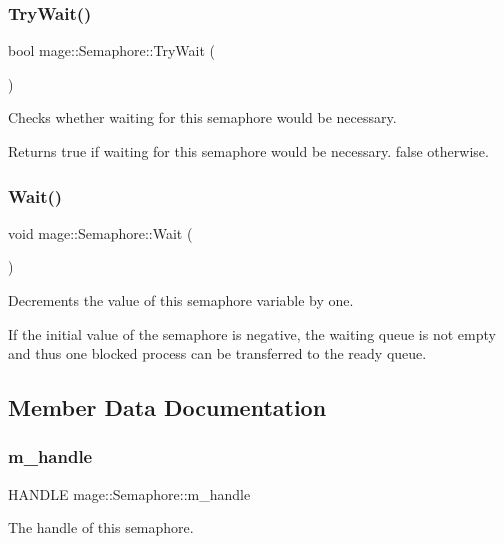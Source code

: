 \subsubsection{\texorpdfstring{Try\+Wait()}{TryWait()}}
{\footnotesize\ttfamily bool mage\+::\+Semaphore\+::\+Try\+Wait (\begin{DoxyParamCaption}{ }\end{DoxyParamCaption})}

Checks whether waiting for this semaphore would be necessary.

\begin{DoxyReturn}{Returns}
{\ttfamily true} if waiting for this semaphore would be necessary. {\ttfamily false} otherwise. 
\end{DoxyReturn}
\hypertarget{classmage_1_1_semaphore_ae63599939b6bcc3939cbeddd7ffa5f66}{}\label{classmage_1_1_semaphore_ae63599939b6bcc3939cbeddd7ffa5f66} 
\subsubsection{\texorpdfstring{Wait()}{Wait()}}
{\footnotesize\ttfamily void mage\+::\+Semaphore\+::\+Wait (\begin{DoxyParamCaption}{ }\end{DoxyParamCaption})}

Decrements the value of this semaphore variable by one.

If the initial value of the semaphore is negative, the waiting queue is not empty and thus one blocked process can be transferred to the ready queue. 

\subsection{Member Data Documentation}
\hypertarget{classmage_1_1_semaphore_ac1ded856984b4ac3739d9ff627838fda}{}\label{classmage_1_1_semaphore_ac1ded856984b4ac3739d9ff627838fda} 
\subsubsection{\texorpdfstring{m\+\_\+handle}{m\_handle}}
{\footnotesize\ttfamily H\+A\+N\+D\+LE mage\+::\+Semaphore\+::m\+\_\+handle\hspace{0.3cm}{\ttfamily [private]}}

The handle of this semaphore. 